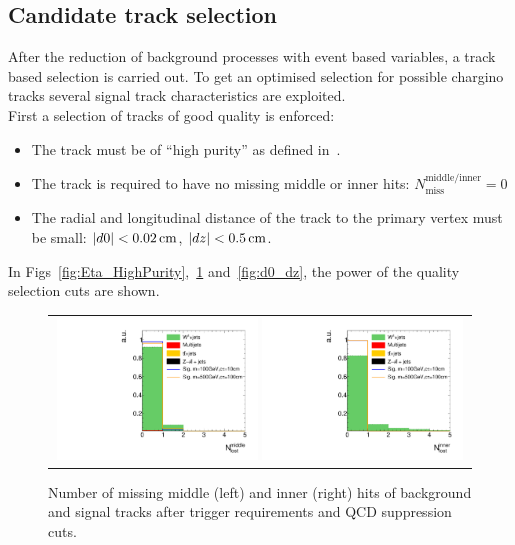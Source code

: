 \subsection*{Candidate track selection}
After the reduction of background processes with event based variables, a track based selection is carried out.
To get an optimised selection for possible chargino tracks several signal track characteristics are exploited.\\

First a selection of tracks of good quality is enforced:
\begin{itemize}
\renewcommand{\labelitemi}{\footnotesize{\ding{118}}}
\item The track must be of ``high purity'' as defined in~\cite{bib:CMS:Tracking_2010}.
\item The track is required to have no missing middle or inner hits: $N_{\text{miss}}^{\text{middle/inner}}=0$
\item The radial and longitudinal  distance of the track to the primary vertex must be small: \mbox{$|d0|<0.02\,\text{cm}$}, \mbox{$|dz|<0.5\,\text{cm}$}.
\end{itemize}
In Figs~\ref{fig:Eta_HighPurity},~\ref{fig:LostHits} and~\ref{fig:d0_dz}, the power of the quality selection cuts are shown.\\
\begin{figure}[!t]
  \centering 
  \begin{tabular}{c}
    \includegraphics[width=0.49\textwidth]{figures/analysis/AnalysisSelection/chiTracksQCDsupressionTrigger_2Signals_FullBkg/htrackNLostMid_lin.pdf}
    \includegraphics[width=0.49\textwidth]{figures/analysis/AnalysisSelection/chiTracksQCDsupressionTrigger_2Signals_FullBkg/htrackNLostInner_lin.pdf}
  \end{tabular}
  \caption{Number of missing middle (left) and inner (right) hits of background and signal tracks after trigger requirements and QCD suppression cuts.}
  \label{fig:LostHits}
\end{figure}
